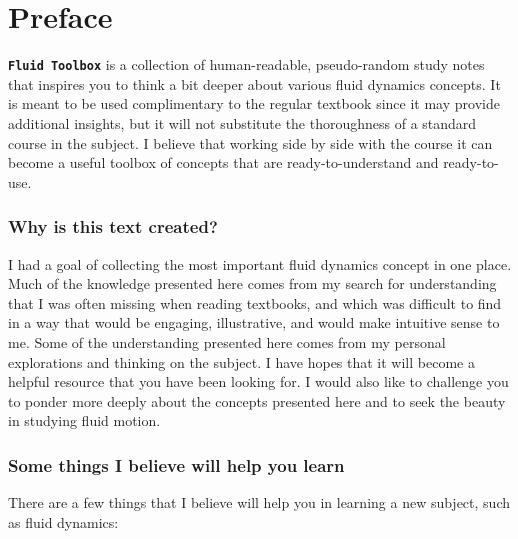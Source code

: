 \documentclass[12pt]{report}
\begin{document}
\setlength{\parskip}{0.6em}
\setlength{\parindent}{0cm}



\chapter*{Preface}
\thispagestyle{empty}



\texttt{\textbf{Fluid Toolbox}} is a collection of human-readable, pseudo-random study notes that inspires you to think a bit deeper about various fluid dynamics concepts. It is meant to be used complimentary to the regular textbook since it may provide additional insights, but it will not substitute the thoroughness of a standard course in the subject. I believe that working side by side with the course it can become a useful toolbox of concepts that are ready-to-understand and ready-to-use.

\subsection*{Why is this text created?}

I had a goal of collecting the most important fluid dynamics concept in one place. Much of the knowledge presented here comes from my search for understanding that I was often missing when reading textbooks, and which was difficult to find in a way that would be engaging, illustrative, and would make intuitive sense to me. Some of the understanding presented here comes from my personal explorations and thinking on the subject. I have hopes that it will become a helpful resource that you have been looking for. I would also like to challenge you to ponder more deeply about the concepts presented here and to seek the beauty in studying fluid motion.

\subsection*{Some things I believe will help you learn}
\thispagestyle{empty}
There are a few things that I believe will help you in learning a new subject, such as fluid dynamics:
\end{document}
